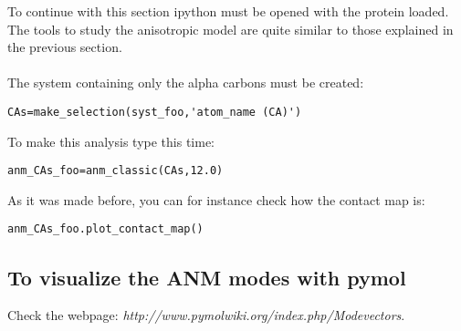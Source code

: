 \documentclass[12pt]{article}
\begin{document}
To continue with this section ipython must be opened with the protein
loaded.  The tools to study the anisotropic model are quite similar to
those explained in the previous section.
\\
\\
The system containing only the alpha carbons must be created:
\begin{verbatim}
CAs=make_selection(syst_foo,'atom_name (CA)')
\end{verbatim}

To make this analysis type this time:

\begin{verbatim}
anm_CAs_foo=anm_classic(CAs,12.0)
\end{verbatim}

As it was made before, you can for instance check how the contact map is:

\begin{verbatim}
anm_CAs_foo.plot_contact_map()
\end{verbatim}


\subsection*{To visualize the ANM modes with pymol}

Check the webpage: \emph{http://www.pymolwiki.org/index.php/Modevectors}.
\end{document}
